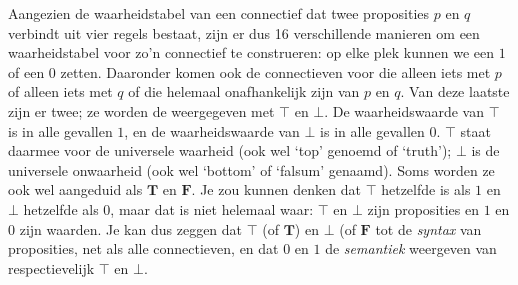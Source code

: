 Aangezien de waarheidstabel van een connectief dat twee proposities $p$ en $q$ verbindt uit vier regels bestaat, zijn er dus 16 verschillende manieren om een waarheidstabel voor zo'n connectief te construeren: op elke plek kunnen we een $1$ of een $0$ zetten. Daaronder komen ook de connectieven voor die alleen iets met $p$ of alleen iets met $q$ of die helemaal onafhankelijk zijn van $p$ en $q$. Van deze laatste zijn er twee; ze worden de weergegeven met $\top$ en $\bot$. De waarheidswaarde van $\top$ is in alle gevallen $1$, en de waarheidswaarde van $\bot$ is in alle gevallen $0$. $\top$ staat daarmee voor de universele waarheid (ook wel `top' genoemd of `truth'); $\bot$ is de universele onwaarheid (ook wel `bottom' of `falsum' genaamd). Soms worden ze ook wel aangeduid als $\mathbf{T}$ en $\mathbf{F}$. Je zou kunnen denken dat $\top$ hetzelfde is als $1$ en $\bot$ hetzelfde als $0$, maar dat is niet helemaal waar: $\top$ en $\bot$ zijn proposities en $1$ en $0$ zijn waarden. Je kan dus zeggen dat $\top$ (of $\mathbf{T}$) en $\bot$ (of $\mathbf{F}$ tot de \textit{syntax} van proposities, net als alle connectieven, en dat $0$ en $1$ de \textit{semantiek} weergeven van respectievelijk $\top$ en $\bot$.
